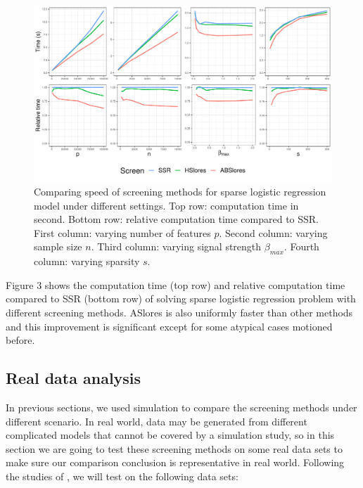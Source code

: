 \documentclass{article}
\begin{document}
\begin{figure}[H]
    \centering
    \includegraphics[scale = 0.59]{plots/bin1.pdf}    \caption{Comparing speed of screening methods for sparse logistic regression model under different settings. Top row: computation time in second. Bottom row: relative computation time compared to SSR. First column: varying number of features $p$. Second column: varying sample size $n$. Third column: varying signal strength $\beta_{max}$. Fourth column: varying sparsity $s$.}
    \label{fig:5.1.2}
\end{figure}

Figure 3 shows the computation time (top row) and relative computation time compared to SSR (bottom row) of solving sparse logistic regression problem with different screening methods. ASlores is also uniformly faster than other methods and this improvement is significant except for some atypical cases motioned before.


\subsection{Real data analysis}
\label{sec:real-data}

In previous sections, we used simulation to compare the screening methods under different scenario. In real world, data may be generated from different complicated models that cannot be covered by a simulation study, so in this section we are going to test these screening methods on some real data sets to make sure our comparison conclusion is representative in real world. Following the studies of \citep{wang2013lasso, xiang2016screening, zeng2017efficient}, we will test on the following data sets:
\end{document}
